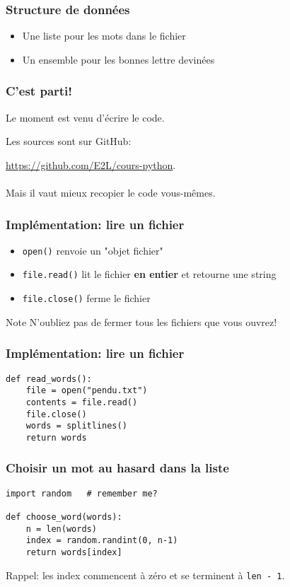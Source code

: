 \documentclass{beamer}
\begin{document}
\begin{frame}[fragile]
  \frametitle{Structure de données}
\begin{itemize}
  \item Une liste pour les mots dans le fichier
  \item Un ensemble pour les bonnes lettre devinées
\end{itemize}
\end{frame}


\begin{frame}[fragile]
  \frametitle{C'est parti!}

Le moment est venu d'écrire le code.

Les sources sont sur GitHub:

\url{https://github.com/E2L/cours-python}. \\~\\

Mais il vaut mieux recopier le code vous-mêmes.

\end{frame}


\begin{frame}[fragile]
  \frametitle{Implémentation: lire un fichier}

\begin{itemize}
  \item \texttt{open()} renvoie un "objet fichier"
  \item \texttt{file.read()} lit le fichier \textbf{en entier} et retourne une string
  \item \texttt{file.close()} ferme le fichier
\end{itemize}

\begin{alertblock}{Note}
  N'oubliez pas de fermer tous les fichiers que vous ouvrez!
\end{alertblock}
\end{frame}

\begin{frame}[fragile]
  \frametitle{Implémentation: lire un fichier}

\begin{lstlisting}
def read_words():
    file = open("pendu.txt")
    contents = file.read()
    file.close()
    words = splitlines()
    return words
\end{lstlisting}

\end{frame}

\begin{frame}[fragile]
  \frametitle{Choisir un mot au hasard dans la liste}
\begin{lstlisting}
import random   # remember me?

def choose_word(words):
    n = len(words)
    index = random.randint(0, n-1)
    return words[index]
\end{lstlisting}

Rappel: les index commencent à zéro et se terminent à \texttt{len - 1}.

\end{frame}
\end{document}
